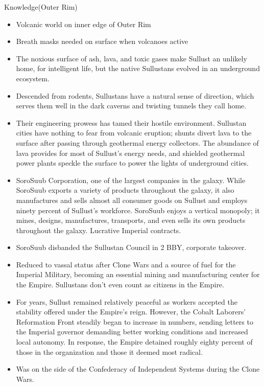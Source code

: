 \documentclass{book}
\begin{document}
\begin{multicols}{2}
\difficulty\difficulty Knowledge(Outer Rim)\\
\begin{itemize}
    \item Volcanic world on inner edge of Outer Rim
    \item Breath masks needed on surface when volcanoes active
    \item The noxious surface of ash, lava, and toxic gases make Sullust an unlikely home, for intelligent life, but the native Sullustans evolved in an underground ecosystem.
    \item \advantage Descended from rodents, Sullustans have a natural sense of direction, which serves them well in the dark caverns and twisting tunnels they call home.
    \item \advantage  Their engineering prowess has tamed their hostile environment. Sullustan cities have nothing to fear from volcanic eruption; shunts divert lava to the surface after passing through geothermal energy collectors. The abundance of lava provides for most of Sullust’s energy needs, and shielded geothermal power plants speckle the surface to power the lights of underground cities.
    \item \advantage SoroSuub Corporation, one of the largest companies in the galaxy. While SoroSuub exports a variety of products throughout the galaxy, it also manufactures and sells almost all consumer goods on Sullust and employs ninety percent of Sullust’s workforce. SoroSuub enjoys a vertical monopoly; it mines, designs, manufactures, transports, and even sells its own products throughout the galaxy. Lucrative Imperial contracts.
	\item \advantage SoroSuub disbanded the Sullustan Council in 2 BBY, corporate takeover.
    \item \advantage Reduced to vassal status after Clone Wars and a source of fuel for the Imperial Military, becoming an essential mining and manufacturing center for the Empire. Sullustans don’t even count as citizens in the Empire.
    \item \advantage For years, Sullust remained relatively peaceful as workers accepted the stability offered under the Empire's reign. However, the Cobalt Laborers' Reformation Front steadily began to increase in numbers, sending letters to the Imperial governor demanding better working conditions and increased local autonomy. In response, the Empire detained roughly eighty percent of those in the organization and those it deemed most radical.
    \item \advantage Was on the side of the Confederacy of Independent Systems during the Clone Wars.

\end{itemize}
\end{multicols}
\end{document}
